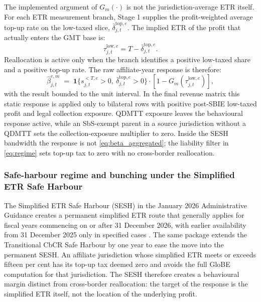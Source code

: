 \documentclass[11pt,a4paper]{article}
\begin{document}
The implemented argument of $G_m(\cdot)$ is not the jurisdiction-average ETR itself. For each ETR measurement branch, Stage 1 supplies the profit-weighted average top-up rate on the low-taxed slice, $\bar{\delta}_{j,t}^{\text{top},e}$. The implied ETR of the profit that actually enters the GMT base is:
\begin{equation}\label{eq:tau_low_segment}
\tau_{j,t}^{\text{low},e} = T - \bar{\delta}_{j,t}^{\text{top},e}.
\end{equation}
Reallocation is active only when the branch identifies a positive low-taxed share and a positive top-up rate. The raw affiliate-year response is therefore:
\begin{equation}\label{eq:beta_aggregated}
\hat{\beta}_{j,t}^{e,m}
\;=\;
\mathbf{1}\{s_{j,t}^{<T,e}>0,\ \bar{\delta}_{j,t}^{\text{top},e}>0\}
\cdot \left[1-G_m\!\left(\tau_{j,t}^{\text{low},e}\right)\right],
\end{equation}
with the result bounded to the unit interval. In the final revenue matrix this static response is applied only to bilateral rows with positive post-SBIE low-taxed profit and legal collection exposure. QDMTT exposure leaves the behavioural response active, while an SbS-exempt parent in a source jurisdiction without a QDMTT sets the collection-exposure multiplier to zero. Inside the SESH bandwidth the response is not \eqref{eq:beta_aggregated}; the liability filter in \eqref{eq:regime} sets top-up tax to zero with no cross-border reallocation.

\subsubsection{Safe-harbour regime and bunching under the Simplified ETR Safe Harbour}\label{sec:bunching}\label{sec:sesh}

The Simplified ETR Safe Harbour (SESH) in the January 2026 Administrative Guidance creates a permanent simplified ETR route that generally applies for fiscal years commencing on or after 31 December 2026, with earlier availability from 31 December 2025 only in specified cases \citep{oecd2026}. The same package extends the Transitional CbCR Safe Harbour by one year to ease the move into the permanent SESH. An affiliate jurisdiction whose simplified ETR meets or exceeds fifteen per cent has its top-up tax deemed zero and avoids the full GloBE computation for that jurisdiction. The SESH therefore creates a behavioural margin distinct from cross-border reallocation: the target of the response is the simplified ETR itself, not the location of the underlying profit.
\end{document}
